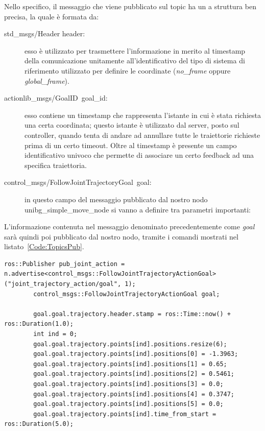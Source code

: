 \begin{description}
	Nello specifico, il messaggio che viene pubblicato sul topic ha un a struttura ben precisa, la quale è formata da:
	\begin{description}
		\item[std\_msgs/Header header:] esso è utilizzato per trasmettere l'informazione in merito al timestamp della comunicazione unitamente all'identificativo del tipo di sistema di riferimento utilizzato per definire le coordinate (\emph{no\_frame} oppure \emph{global\_frame}).
		\item[actionlib\_msgs/GoalID\ goal\_id:] esso contiene un timestamp che rappresenta l'istante in cui è stata richiesta una certa coordinata; questo istante è utilizzato dal server, posto sul controller, quando tenta di andare ad annullare tutte le traiettorie richieste prima di un certo timeout.
		Oltre al timestamp è presente un campo identificativo univoco che permette di associare un certo feedback ad una specifica traiettoria.
		\item[control\_msgs/FollowJointTrajectoryGoal\ goal:] in questo campo del messaggio pubblicato dal nostro nodo unibg\_simple\_move\_node si vanno a definire tra parametri importanti:
	\end{description}
	L'informazione contenuta nel messaggio denominato precedentemente come \emph{goal} sarà quindi poi pubblicato dal nostro nodo, tramite i comandi mostrati nel listato~\vref{Code:TopicsPub}.
	\begin{lstlisting}[style=Matlab-editor,caption=Pubblicazione messagio \emph{trajectory} di esempio nel topic corrispondente,captionpos=b,label={Code:TopicsPub}, basicstyle=\tiny\ttfamily,frame=trBL]
		ros::Publisher pub_joint_action = n.advertise<control_msgs::FollowJointTrajectoryActionGoal>("joint_trajectory_action/goal", 1);
		control_msgs::FollowJointTrajectoryActionGoal goal;

		goal.goal.trajectory.header.stamp = ros::Time::now() + ros::Duration(1.0);
		int ind = 0;
		goal.goal.trajectory.points[ind].positions.resize(6);
		goal.goal.trajectory.points[ind].positions[0] = -1.3963;
		goal.goal.trajectory.points[ind].positions[1] = 0.65;
		goal.goal.trajectory.points[ind].positions[2] = 0.5461;
		goal.goal.trajectory.points[ind].positions[3] = 0.0;
		goal.goal.trajectory.points[ind].positions[4] = 0.3747;
		goal.goal.trajectory.points[ind].positions[5] = 0.0;
		goal.goal.trajectory.points[ind].time_from_start = ros::Duration(5.0);
	\end{lstlisting}
\end{description}
